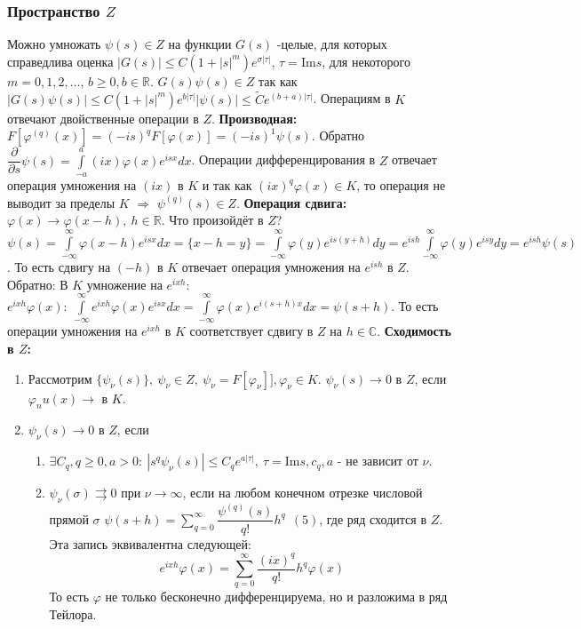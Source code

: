 \documentclass[9pt, a4paper]{article}
\begin{document}
		\subsubsection{Пространство $Z$}
			Можно умножать $\psi(s) \in Z$ на функции $G(s)$ -целые, для которых справедлива оценка $|G(s)| \leq C(1 + |s|^m) e^{\sigma |\tau|}$, $\tau = \mathrm{Im}s$, для некоторого $m =0, 1,2, \dots$, $ b \geq 0, b \in \mathbb{R}$. $G(s)\psi(s) \in Z$ так как $|G(s) \psi(s) | \leq C(1 + |s|^m) e^{b|\tau|} |\psi(s)| \leq \tilde{C} e^{(b+a) |\tau|}$.
			\newline
			Операциям в $K$ отвечают двойственные операции в $Z$. \newline
			\textbf{Производная:} $F[\varphi^{(q)}(x)] = (-is)^q F[\varphi(x)] = (-is)^1 \psi(s)$. Обратно $\dfrac{\partial }{\partial s}\psi(s) = \int\limits_{-a}^{a} (ix) \varphi(x) e^{isx} dx$. Операции дифференцирования в $Z$ отвечает операция умножения на $(ix)$ в $K$ и так как $(ix)^q \varphi(x) \in K$, то операция не выводит за пределы $K$ $\Rightarrow$  $\psi^{(q)}(s) \in Z$.\newline
			\textbf{Операция сдвига:} $\varphi(x) \to \varphi(x-h), \ h \in \mathbb{R}$. Что произойдёт в $Z$? $\psi(s) = \int\limits_{-\infty}^{\infty} \varphi(x-h)e^{isx} dx = \{x -h =y\}= \int\limits_{-\infty}^{\infty} \varphi(y) e^{is(y+h)} dy = e^{ish}\int\limits_{-\infty}^{\infty} \varphi(y) e^{isy} dy = e^{ish} \psi(s)$. То есть сдвигу на $(-h)$ в $K$ отвечает операция умножения на $e^{ish}$ в $Z$. Обратно: В $K$ умножение на $e^{ixh}$: $e^{ixh} \varphi(x): \ \int\limits_{-\infty}^{\infty} e^{ixh} \varphi(x) e^{isx} dx = \int\limits_{-\infty}^{\infty} \varphi(x) e^{i(s+h)x}dx = \psi(s+h)$.  То есть операции умножения на $e^{ixh}$ в $K$ соответствует сдвигу в $Z$ на $h \in \mathbb{C}$. \newline
			\textbf{Сходимость в $Z$:}
			\begin{enumerate}
				\item Рассмотрим $\{\psi_\nu(s)\}, \ \psi_\nu \in Z, \ \psi_\nu = F[\varphi_\nu]], \varphi_\nu \in K.$ $\psi_\nu(s) \to 0$ в $Z$, если $\varphi_nu(x) \to $ в $K$.
				\item $\psi_\nu(s) \to 0$ в $Z$, если 
					\begin{enumerate}
						\item $\exists C_q, q \geq 0, a > 0: \ |s^q \psi_\nu(s)| \leq C_q e^{a|\tau|}, \ \tau = \mathrm{Im} s, c_q, a$ - не зависит от $\nu$.
						\item $\psi_\nu(\sigma) \rightrightarrows 0$ при $\nu \to \infty$, если на любом конечном отрезке числовой прямой $\sigma$ $\psi(s+h) = \sum\limits_{q=0}^{\infty} \dfrac{\psi^{(q)}(s)}{q!} h^q \ \ (5)$, где ряд сходится в $Z$. Эта запись эквивалентна следующей:
						\begin{equation*}
							e^{ixh}\varphi(x) = \sum\limits_{q=0}^{\infty} \dfrac{(ix)^q}{q!} h^q \varphi(x)
						\end{equation*}
						То есть $\varphi$ не только бесконечно дифференцируема, но и разложима в ряд Тейлора.
					\end{enumerate}
			\end{enumerate}
\end{document}
